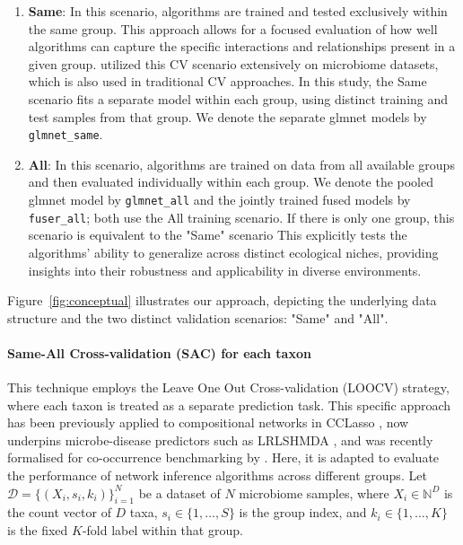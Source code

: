 \documentclass[]{Liebert_Author_revised}
\begin{document}
\begin{enumerate}
    \item \textbf{Same}: In this scenario, algorithms are trained and tested exclusively within the same group.
    This approach allows for a focused evaluation of how well algorithms can capture the specific interactions and relationships present in a given group.
    \citet{agyapong2025cross} utilized this CV scenario extensively on microbiome datasets, which is also used in traditional CV approaches.
    In this study, the Same scenario fits a separate model within each group, using distinct training and test samples from that group. We denote the separate glmnet models by \texttt{glmnet\_same}.

    \item \textbf{All}: In this scenario, algorithms are trained on data from all available groups and then evaluated individually within each group.
    We denote the pooled glmnet model by \texttt{glmnet\_all} and the jointly trained fused models by \texttt{fuser\_all}; both use the All training scenario.
    If there is only one group, this scenario is equivalent to the "Same" scenario \citep{hocking2024soaksameotherallkfoldcrossvalidation}
    This explicitly tests the algorithms' ability to generalize across distinct ecological niches, providing insights into their robustness and applicability in diverse environments.
\end{enumerate}

Figure~\ref{fig:conceptual} illustrates our approach, depicting the underlying data structure and the two distinct validation scenarios: "Same" and "All".
\paragraph{Same-All Cross-validation (SAC) for each taxon}
This technique employs the Leave One Out Cross-validation (LOOCV) strategy, where each taxon is treated as a separate prediction task.
This specific approach has been previously applied to compositional networks in CCLasso \citep{fang2015cclasso}, now underpins microbe-disease predictors such as LRLSHMDA \citep{wang2017lrlshmda}, and was recently formalised for co-occurrence benchmarking by \citet{agyapong2025cross}.
Here, it is adapted to evaluate the performance of network inference algorithms across different groups.
Let \(\mathcal{D}=\{(X_i,s_i,k_i)\}_{i=1}^{N}\) be a dataset of \(N\) microbiome samples,
where \(X_i\in\mathbb{N}^{D}\) is the count vector of \(D\) taxa,
\(s_i\in\{1,\dots,S\}\) is the group index,
and \(k_i\in\{1,\dots,K\}\) is the fixed \(K\)-fold label within that group.
\end{document}
